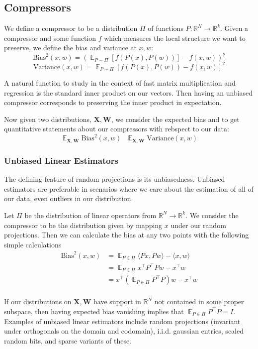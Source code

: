\documentclass{article}
\theoremstyle{definition}
\theoremstyle{plain}
\newcommand{\R}{\mathbb{R}}
\DeclareMathOperator{\E}{\mathbb{E}}
\begin{document}
\subsection*{Compressors}
We define a compressor to be a distribution $\Pi$ of functions $P: \R^N \to \R^k$. Given a compressor and some function $f$ which measures the local structure we want to preserve, we define the bias and variance at $x,w$:
\[\text{Bias}^2(x,w) = \left(\E_{P \sim \Pi} [f(P(x), P(w))] - f(x,w)\right)^2\]
\[\text{Variance}(x,w) =  \E_{P \sim \Pi} [f(P(x), P(w)) - f(x,w)]^2\]

A natural function to study in the context of fast matrix multiplication and regression is the standard inner product on our vectors. Then having an unbiased compressor corresponds to preserving the inner product in expectation. 

Now given two distributions, $\mathbf{X}, \mathbf{W}$, we consider the expected bias and to get quantitative statements about our compressors with rebspect to our data:
\[\E_{\mathbf{X}, \mathbf{W}} \text{Bias}^2(x,w)~~~ \E_{\mathbf{X},\mathbf{W}} \text{Variance}(x,w)\]




\subsubsection*{Unbiased Linear Estimators}
The defining feature of random projections is its unbiasedness. Unbiased estimators are preferable in scenarios where we care about the estimation of all of our data, even outliers in our distribution. 

Let $\Pi$ be the distribution of linear operators from $\R^N \to \R^k$. We consider the compressor to be the distribution given by mapping $x$ under our random projections. Then we can calculate the bias at any two points with the following simple calculations
\begin{align*}\text{Bias}^2(x,w) &= \E_{P \in \Pi} \langle Px, Pw \rangle - \langle x, w \rangle\\
&= \E_{P \in \Pi} x^\top P^\top P w - x^\top w\\ 
&= x^\top (\E_{P \in \Pi} P^\top P) w - x^\top w\\ 
\end{align*}

If our distributions on $\mathbf{X}, \mathbf{W}$ have support in $\R^N$ not contained in some proper subspace, then having expected bias vanishing implies that $\E_{P \in \Pi} P^\top P = I$. Examples of unbiased linear estimators include random projections (invariant under orthogonals on the domain and codomain), i.i.d. gaussian entries, scaled random bits, and sparse variants of these.
\end{document}
